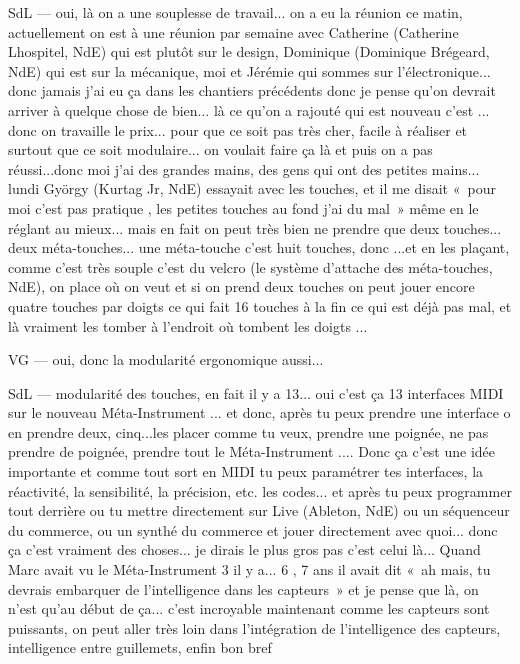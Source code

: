 SdL — oui, là on a une souplesse de travail... on a eu la réunion ce matin, actuellement on est à une réunion par semaine avec Catherine (Catherine Lhospitel, NdE) qui est plutôt sur le design, Dominique (Dominique Brégeard, NdE) qui est sur la mécanique, moi et Jérémie qui sommes sur l'électronique... donc jamais j'ai eu ça dans les chantiers précédents donc je pense qu'on devrait arriver à quelque chose de bien... là ce qu'on a rajouté qui est nouveau c'est ... donc on travaille le prix... pour que ce soit pas très cher, facile à réaliser et surtout que ce soit modulaire... on voulait faire ça là et puis on a pas réussi...donc moi j'ai des grandes mains, des gens qui ont des petites mains... lundi György (Kurtag Jr, NdE) essayait avec les touches, et il me disait « pour moi c'est pas pratique , les petites touches au fond j'ai du mal » même en le réglant au mieux... mais en fait on peut très bien ne prendre que deux touches... deux méta-touches... une méta-touche c'est huit touches, donc ...et en les plaçant, comme c'est très souple c'est du velcro (le système d'attache des méta-touches, NdE), on place où on veut et si on prend deux touches on peut jouer encore quatre touches par doigts ce qui fait 16 touches à la fin ce qui est déjà pas mal, et là vraiment les tomber à l'endroit où tombent les doigts ... 

VG — oui, donc la modularité ergonomique aussi... 

SdL — modularité des touches, en fait il y a 13... oui c'est ça 13 interfaces MIDI sur le nouveau Méta-Instrument ... et donc, après tu peux prendre une interface o en prendre deux, cinq...les placer comme tu veux, prendre une poignée, ne pas prendre de poignée, prendre tout le Méta-Instrument .... Donc ça c'est une idée importante et comme tout sort en MIDI tu peux paramétrer tes interfaces, la réactivité, la sensibilité, la précision, etc. les codes... et après tu peux programmer tout derrière ou tu mettre directement sur Live (Ableton, NdE) ou un séquenceur du commerce, ou un synthé du commerce et jouer directement avec quoi... donc ça c'est vraiment des choses... je dirais le plus gros pas c'est celui là... Quand Marc avait vu le Méta-Instrument 3 il y a... 6 , 7 ans il avait dit « ah mais, tu devrais embarquer de l'intelligence dans les capteurs » et je pense que là, on n'est qu'au début de ça... c'est incroyable maintenant comme les capteurs sont puissants, on peut aller très loin dans l'intégration de l'intelligence des capteurs, intelligence entre guillemets, enfin bon bref 

